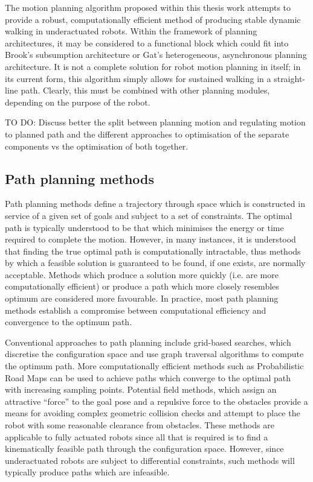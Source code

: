 The motion planning algorithm proposed within this thesis work attempts to provide a robust, computationally efficient method of producing stable dynamic walking in underactuated robots. Within the framework of planning architectures, it may be considered to a functional block which could fit into Brook's subsumption architecture or Gat's heterogeneous, asynchronous planning architecture. It is not a complete solution for robot motion planning in itself; in its current form, this algorithm simply allows for sustained walking in a straight-line path. Clearly, this must be combined with other planning modules, depending on the purpose of the robot.

{\color{red} TO DO: Discuss better the split between planning motion and regulating motion to planned path and the different approaches to optimisation of the separate components vs the optimisation of both together.}



\subsection{Path planning methods}
Path planning methods define a trajectory through space which is constructed in service of a given set of goals and subject to a set of constraints. The optimal path is typically understood to be that which minimises the energy or time required to complete the motion. However, in many instances, it is understood that finding the true optimal path is computationally intractable, thus methods by which a feasible solution is guaranteed to be found, if one exists, are normally acceptable. Methods which produce a solution more quickly (i.e. are more computationally efficient) or produce a path which more closely resembles optimum are considered more favourable. In practice, most path planning methods establish a compromise between computational efficiency and convergence to the optimum path. 

Conventional approaches to path planning include grid-based searches, which discretise the configuration space and use graph traversal algorithms to compute the optimum path. More computationally efficient methods such as Probabilistic Road Maps \cite{boor1999gaussian} can be used to achieve paths which converge to the optimal path with increasing sampling points. Potential field methods, which assign an attractive ``force'' to the goal pose and a repulsive force to the obstacles provide a means for avoiding complex geometric collision checks and attempt to place the robot with some reasonable clearance from obstacles. These methods are applicable to fully actuated robots since all that is required is to find a kinematically feasible path through the configuration space. However, since underactuated robots are subject to differential constraints, such methods will typically produce paths which are infeasible. 

